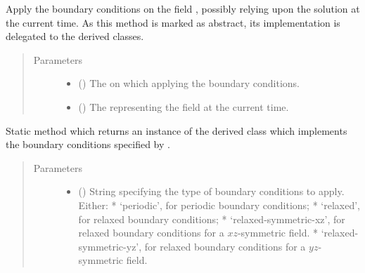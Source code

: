 \documentclass[letterpaper,10pt,english]{sphinxmanual}
\begin{document}
\begin{fulllineitems}
\begin{fulllineitems}
\label{\detokenize{api:dycore.horizontal_boundary.HorizontalBoundary.apply}}
Apply the boundary conditions on the field , possibly relying upon the solution
 at the current time.
As this method is marked as abstract, its implementation is delegated to the derived classes.
\begin{quote}\begin{description}
\item[{Parameters}] \leavevmode\begin{itemize}
\item {} 
 () \textendash{} The  on which applying the boundary conditions.

\item {} 
 () \textendash{} The  representing the field at the current time.

\end{itemize}

\end{description}\end{quote}

\end{fulllineitems}


\begin{fulllineitems}
\label{\detokenize{api:dycore.horizontal_boundary.HorizontalBoundary.factory}}
Static method which returns an instance of the derived class which implements the boundary
conditions specified by .
\begin{quote}\begin{description}
\item[{Parameters}] \leavevmode\begin{itemize}
\item {} 
 () \textendash{} String specifying the type of boundary conditions to apply. Either:
* ‘periodic’, for periodic boundary conditions;
* ‘relaxed’, for relaxed boundary conditions;
* ‘relaxed-symmetric-xz’, for relaxed boundary conditions for a \(xz\)-symmetric field.
* ‘relaxed-symmetric-yz’, for relaxed boundary conditions for a \(yz\)-symmetric field.


\end{itemize}
\end{description}
\end{quote}
\end{fulllineitems}
\end{fulllineitems}
\end{document}
